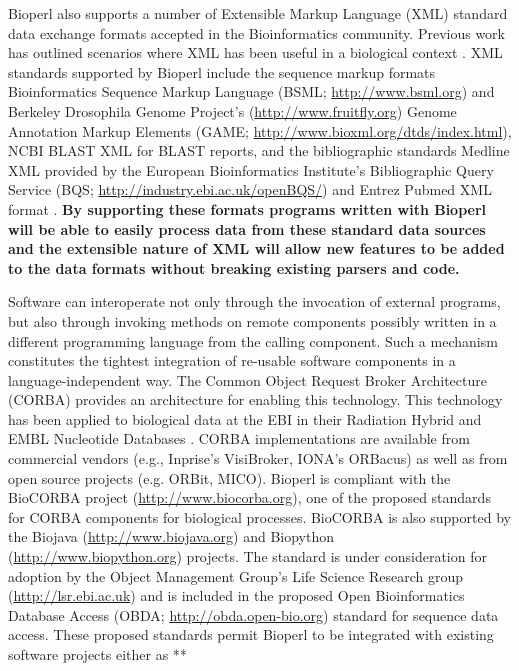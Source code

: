 \documentclass[12pt]{article}
\begin{document}
Bioperl also supports a number of Extensible Markup Language (XML)
standard data exchange formats accepted in the Bioinformatics
community.  Previous work has outlined scenarios where XML has been
useful in a biological context \cite{xmlbioinformatics}.  XML
standards supported by Bioperl include the sequence markup formats
Bioinformatics Sequence Markup Language (BSML;
\url{http://www.bsml.org}) and Berkeley Drosophila Genome Project's
(\url{http://www.fruitfly.org}) Genome Annotation Markup Elements
(GAME; \url{http://www.bioxml.org/dtds/index.html}), NCBI BLAST XML
for BLAST reports, and the bibliographic standards Medline XML
provided by the European Bioinformatics Institute's Bibliographic
Query Service (BQS; \url{http://industry.ebi.ac.uk/openBQS/}) and
Entrez Pubmed XML format \cite{entrez}.\textbf{  By supporting these formats
programs written with Bioperl will be able to easily process data from
these standard data sources and the extensible nature of XML will
allow new features to be added to the data formats without breaking
existing parsers and code. }

Software can interoperate not only through the invocation of external
programs, but also through invoking methods on remote components
possibly written in a different programming language from the calling
component.  Such a mechanism constitutes the tightest integration of
re-usable software components in a language-independent way.  The
Common Object Request Broker Architecture (CORBA) \cite{corba}
provides an architecture for enabling this technology.  This
technology has been applied to biological data at the EBI in their
Radiation Hybrid \cite{rhdb} and EMBL Nucleotide Databases
\cite{embl-corba}.  CORBA implementations are available from
commercial vendors (e.g., Inprise's VisiBroker, IONA's ORBacus) as
well as from open source projects (e.g. ORBit, MICO).  Bioperl is
compliant with the BioCORBA project (\url{http://www.biocorba.org}),
one of the proposed standards for CORBA components for biological
processes.  BioCORBA is also supported by the Biojava
(\url{http://www.biojava.org}) and Biopython
(\url{http://www.biopython.org}) projects.  The standard is under
consideration for adoption by the Object Management Group's Life
Science Research group (\url{http://lsr.ebi.ac.uk}) and is included in
the proposed Open Bioinformatics Database Access (OBDA;
\url{http://obda.open-bio.org}) standard for sequence data access.
These proposed standards permit Bioperl to be integrated with existing
software projects either as **
\end{document}
